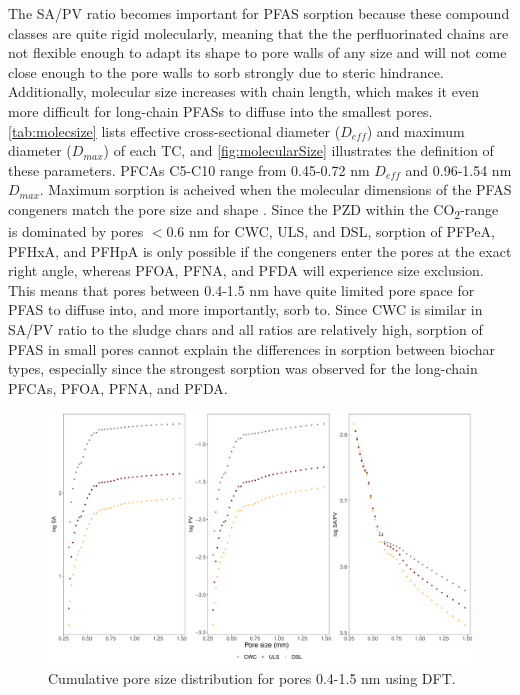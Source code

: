 The SA/PV ratio becomes important for PFAS sorption because these compound classes are quite rigid molecularly, meaning that the the perfluorinated chains are not flexible enough to adapt its shape to pore walls of any size and will not come close enough to the pore walls to sorb strongly due to steric hindrance. Additionally, molecular size increases with chain length, which makes it even more difficult for long-chain PFASs to diffuse into the smallest pores. \cref{tab:molecsize} lists effective cross-sectional diameter ($D_{eff}$) and maximum diameter ($D_{max}$) of each TC, and \cref{fig:molecularSize} illustrates the definition of these parameters. PFCAs C5-C10 range from 0.45-0.72 nm $D_{eff}$ and 0.96-1.54 nm $D_{max}$. Maximum sorption is acheived when the molecular dimensions of the PFAS congeners match the pore size and shape \citep{Hale2016}. Since the PZD within the CO\textsubscript{2}-range is dominated by pores $<$0.6 nm for CWC, ULS, and DSL, sorption of PFPeA, PFHxA, and PFHpA is only possible if the congeners enter the pores at the exact right angle, whereas PFOA, PFNA, and PFDA will experience size exclusion. This means that pores between 0.4-1.5 nm have quite limited pore space for PFAS to diffuse into, and more importantly, sorb to. Since CWC is similar in SA/PV ratio to the sludge chars and all ratios are relatively high, sorption of PFAS in small pores cannot explain the differences in sorption between biochar types, especially since the strongest sorption was observed for the long-chain PFCAs, PFOA, PFNA, and PFDA.

\begin{figure}
    \centering
    \includegraphics[width=\textwidth]{R/figs/Correlation_SAPV_small_plot.pdf}
    \caption{Cumulative pore size distribution for pores 0.4-1.5 nm using DFT.}
    \label{fig:PZD_small}
\end{figure}

